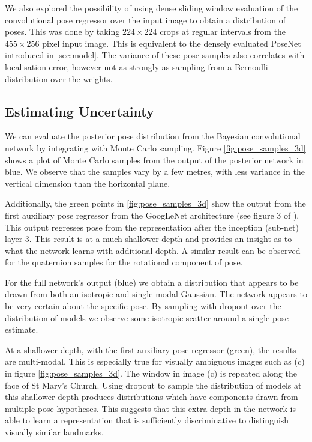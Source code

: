 We also explored the possibility of using dense sliding window evaluation of the convolutional pose regressor over the input image to obtain a distribution of poses. This was done by taking $224\times224$ crops at regular intervals from the $455\times256$ pixel input image. This is equivalent to the densely evaluated PoseNet introduced in \cref{sec:model}. The variance of these pose samples also correlates with localisation error, however not as strongly as sampling from a Bernoulli distribution over the weights.

\subsection{Estimating Uncertainty}

We can evaluate the posterior pose distribution from the Bayesian convolutional network by integrating with Monte Carlo sampling. Figure \ref{fig:pose_samples_3d} shows a plot of Monte Carlo samples from the output of the posterior network in blue. We observe that the samples vary by a few metres, with less variance in the vertical dimension than the horizontal plane.

Additionally, the green points in \ref{fig:pose_samples_3d} show the output from the first auxiliary pose regressor from the GoogLeNet architecture (see figure 3 of \citep{szegedy2014going}). This output regresses pose from the representation after the inception (sub-net) layer 3. This result is at a much shallower depth and provides an insight as to what the network learns with additional depth. A similar result can be observed for the quaternion samples for the rotational component of pose.

For the full network's output (blue) we obtain a distribution that appears to be drawn from both an isotropic and single-modal Gaussian. The network appears to be very certain about the specific pose. By sampling with dropout over the distribution of models we observe some isotropic scatter around a single pose estimate.

At a shallower depth, with the first auxiliary pose regressor (green), the results are multi-modal. This is especially true for visually ambiguous images such as (c) in figure \ref{fig:pose_samples_3d}. The window in image (c) is repeated along the face of St Mary's Church. Using dropout to sample the distribution of models at this shallower depth produces distributions which have components drawn from multiple pose hypotheses. This suggests that this extra depth in the network is able to learn a representation that is sufficiently discriminative to distinguish visually similar landmarks.

